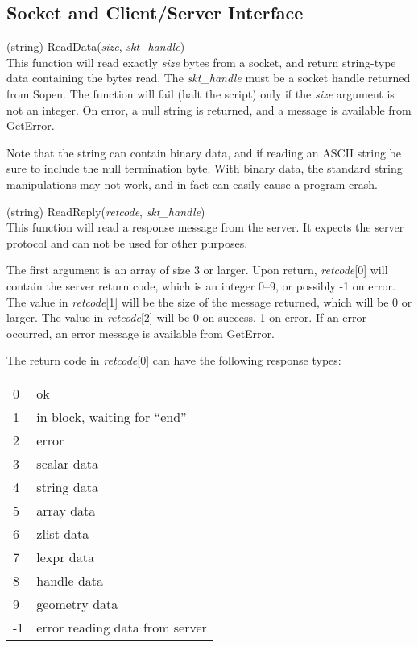\subsection{Socket and {\Xic} Client/Server Interface}
\begin{description}
\item{(string) \vt ReadData({\it size\/}, {\it skt\_handle\/})}\\
This function will read exactly {\it size} bytes from a socket, and
return string-type data containing the bytes read.  The {\it
skt\_handle} must be a socket handle returned from {\vt Sopen}.  The
function will fail (halt the script) only if the {\it size} argument
is not an integer.  On error, a null string is returned, and a message
is available from {\vt GetError}.

Note that the string can contain binary data, and if reading an
ASCII string be sure to include the null termination byte.  With
binary data, the standard string manipulations may not work, and
in fact can easily cause a program crash.

\item{(string) \vt ReadReply({\it retcode\/}, {\it skt\_handle\/})}\\
This function will read a response message from the {\Xic} server.  It
expects the {\Xic} server protocol and can not be used for other
purposes.

The first argument is an array of size 3 or larger.  Upon return, {\it
retcode\/}[0] will contain the server return code, which is an integer
0--9, or possibly -1 on error.  The value in {\it retcode\/}[1] will be
the size of the message returned, which will be 0 or larger.  The
value in {\it retcode\/}[2] will be 0 on success, 1 on error.  If an
error occurred, an error message is available from {\vt GetError}.

The return code in {\it retcode\/}[0] can have the following response
types:

\begin{tabular}{ll}
0 & ok\\
1 & in block, waiting for ``end''\\
2 & error\\
3 & scalar data\\
4 & string data\\
5 & array data\\
6 & zlist data\\
7 & lexpr data\\
8 & handle data\\
9 & geometry data\\
-1 & error reading data from server\\
\end{tabular}


\end{description}
